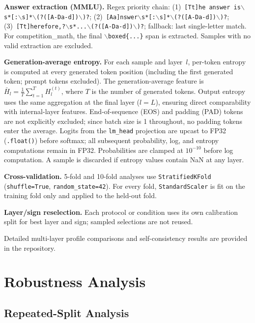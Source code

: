 \documentclass{ieeeaccess}
\begin{document}
{\textbf{Answer extraction (MMLU).} Regex priority chain: (1)~\texttt{[Tt]he answer is\allowbreak$\backslash$s*[:$\backslash$s]*\allowbreak$\backslash$(?([A-Da-d])\allowbreak$\backslash$)?}; (2)~\texttt{[Aa]nswer\allowbreak$\backslash$s*[:$\backslash$s]*\allowbreak$\backslash$(?([A-Da-d])\allowbreak$\backslash$)?}; (3)~\texttt{[Tt]herefore\allowbreak ,?$\backslash$s*...\allowbreak$\backslash$(?([A-Da-d])\allowbreak$\backslash$)?}; fallback: last single-letter match. For competition\_math, the final \texttt{$\backslash$boxed\{\allowbreak ...\}} span is extracted. Samples with no valid extraction are excluded.

\textbf{Generation-average entropy.} For each sample and layer~$l$, per-token entropy is computed at every generated token position (including the first generated token; prompt tokens excluded). The generation-average feature is $\bar{H}_l = \frac{1}{T} \sum_{t=1}^{T} H_l^{(t)}$, where $T$ is the number of generated tokens. Output entropy uses the same aggregation at the final layer ($l = L$), ensuring direct comparability with internal-layer features. End-of-sequence (EOS) and padding (PAD) tokens are not explicitly excluded; since batch size is 1 throughout, no padding tokens enter the average. Logits from the \texttt{lm\_head} projection are upcast to FP32 (\texttt{.float()}) before softmax; all subsequent probability, log, and entropy computations remain in FP32. Probabilities are clamped at $10^{-10}$ before log computation. A sample is discarded if entropy values contain NaN at any layer.

\textbf{Cross-validation.} 5-fold and 10-fold analyses use \texttt{StratifiedKFold} (\texttt{shuffle=True}, \texttt{random\_state=42}). For every fold, \texttt{StandardScaler} is fit on the training fold only and applied to the held-out fold.

\textbf{Layer/sign reselection.} Each protocol or condition uses its own calibration split for best layer and sign; sampled selections are not reused.
}%

Detailed multi-layer profile comparisons and self-consistency results are provided in the repository.

\FloatBarrier
\section{Robustness Analysis}
\label{app:repeated}

\subsection{Repeated-Split Analysis}
\end{document}
